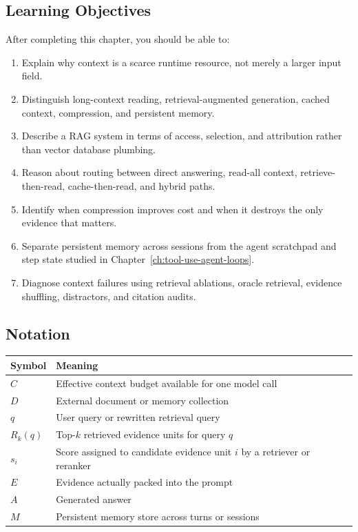 \subsection*{Learning Objectives}

After completing this chapter, you should be able to:

\begin{enumerate}
  \item Explain why context is a scarce runtime resource, not merely a larger input field.
  \item Distinguish long-context reading, retrieval-augmented generation, cached context, compression, and persistent memory.
  \item Describe a RAG system in terms of access, selection, and attribution rather than vector database plumbing.
  \item Reason about routing between direct answering, read-all context, retrieve-then-read, cache-then-read, and hybrid paths.
  \item Identify when compression improves cost and when it destroys the only evidence that matters.
  \item Separate persistent memory across sessions from the agent scratchpad and step state studied in Chapter~\ref{ch:tool-use-agent-loops}.
  \item Diagnose context failures using retrieval ablations, oracle retrieval, evidence shuffling, distractors, and citation audits.
\end{enumerate}

\subsection*{Notation}

\begin{center}
\begin{tabularx}{\textwidth}{@{}lX@{}}
\toprule
Symbol & Meaning \\
\midrule
$C$ & Effective context budget available for one model call \\
$D$ & External document or memory collection \\
$q$ & User query or rewritten retrieval query \\
$R_k(q)$ & Top-$k$ retrieved evidence units for query $q$ \\
$s_i$ & Score assigned to candidate evidence unit $i$ by a retriever or reranker \\
$E$ & Evidence actually packed into the prompt \\
$A$ & Generated answer \\
$M$ & Persistent memory store across turns or sessions \\
\bottomrule
\end{tabularx}
\end{center}

